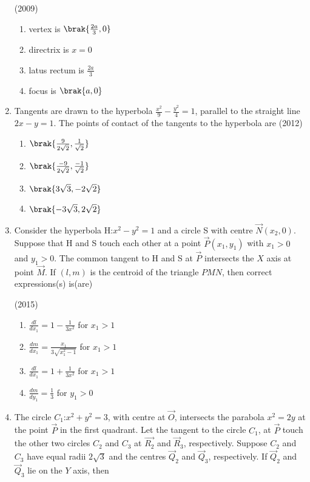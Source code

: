 \begin{enumerate}
		\hfill(2009)
		\begin{multicols}{2}
\begin{enumerate}
			\item vertex is $\brak{\frac{2a}{3},0}$
			\item directrix is $x=0$
				\columnbreak
			\item latus rectum is $\frac{2a}{3}$
			\item focus is $\brak{a,0}$
		\end{enumerate}
\end{multicols}
	\item Tangents are drawn to the hyperbola $\frac{x^2}{9}-\frac{y^2}{4}=1$, parallel to the straight line $2x-y=1$. The points of contact of the tangents to the hyperbola
		are  
		\hfill(2012)
		
		 \begin{multicols}{4}
\begin{enumerate}
			\item $\brak{\frac{9}{2\sqrt{2}},\frac{1}{\sqrt{2}}}$ 
			\item $ \brak{\frac{-9}{2\sqrt{2}},\frac{-1}{\sqrt{2}}}$
			\item $\brak{3\sqrt{3},-2\sqrt{2}}$
			\item $ \brak{-3\sqrt{3},2\sqrt{2}}$
		
		 \end{enumerate}
\end{multicols}
	\item Consider the hyperbola H:$x^2-y^2=1$ and a circle S with 
		centre $\vec{N}(x_2,0)$. Suppose that H and S touch each other at a 
	      point $\vec{P}(x_1,y_1)$ with $x_1>0$ and $y_1>0$. The common tangent to H and S at $\vec{P}$ intersects the $X$ axis at point $\vec{M}$. If $(l,m)$ is the centroid of the triangle $PMN$, then correct expressions(s) is(are)
	      
	      \hfill(2015)
	      
	       \begin{multicols}{2}
\begin{enumerate}
		      \item $\frac{dl}{dx_1}=1-\frac{1}{3x^2}$ for $x_1>1$ 
		      \item $\frac{dm}{dx_1}=\frac{x_1}{3\sqrt{x_1^2-1}}$ for $x_1>1$ 
		      \item $\frac{dl}{dx_1}=1+\frac{1}{3x^2}$ for $x_1>1$
		      \item $\frac{dm}{dy_1}=\frac{1}{3}$ for $y_1>0$ 
	       \end{enumerate}
\end{multicols}
      \item The circle $C_1$:$x^2+y^2=3$, with centre at $\vec{O}$, intersects the parabola $x^2=2y$ at the point $\vec{P}$ in the first quadrant. Let the tangent to the circle $C_1$, at $\vec{P}$ touch the other two circles $C_2$ and $C_3$ at $\vec{R_2}$ and $\vec{R}_3$, respectively. Suppose $C_2$ and $C_3$ have equal radii $2\sqrt{3}$ and the centres $\vec{Q}_2$ and $\vec{Q}_3$, respectively. If $\vec{Q}_2$ and $\vec{Q}_3$ lie on the $Y$ axis, then 


\end{enumerate}
